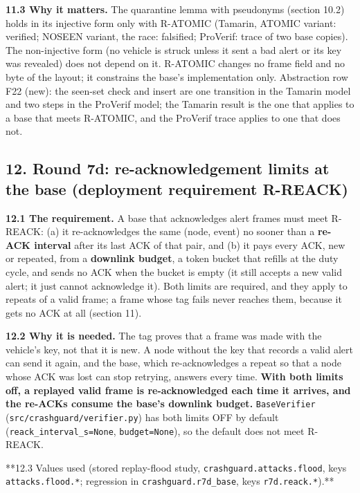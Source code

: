 \textbf{11.3 Why it matters.} The quarantine lemma with pseudonyms (section 10.2) holds in its injective form only with R-ATOMIC (Tamarin, ATOMIC variant: verified; NOSEEN variant, the race: falsified; ProVerif: trace of two base copies). The non-injective form (no vehicle is struck unless it sent a bad alert or its key was revealed) does not depend on it. R-ATOMIC changes no frame field and no byte of the layout; it constrains the base's implementation only. Abstraction row F22 (new): the seen-set check and insert are one transition in the Tamarin model and two steps in the ProVerif model; the Tamarin result is the one that applies to a base that meets R-ATOMIC, and the ProVerif trace applies to one that does not.



\subsection*{12. Round 7d: re-acknowledgement limits at the base (deployment requirement R-REACK)}

\textbf{12.1 The requirement.} A base that acknowledges alert frames must meet R-REACK: (a) it re-acknowledges the same (node, event) no sooner than a \textbf{re-ACK interval} after its last ACK of that pair, and (b) it pays every ACK, new or repeated, from a \textbf{downlink budget}, a token bucket that refills at the duty cycle, and sends no ACK when the bucket is empty (it still accepts a new valid alert; it just cannot acknowledge it). Both limits are required, and they apply to repeats of a valid frame; a frame whose tag fails never reaches them, because it gets no ACK at all (section 11).

\textbf{12.2 Why it is needed.} The tag proves that a frame was made with the vehicle's key, not that it is new. A node without the key that records a valid alert can send it again, and the base, which re-acknowledges a repeat so that a node whose ACK was lost can stop retrying, answers every time. \textbf{With both limits off, a replayed valid frame is re-acknowledged each time it arrives, and the re-ACKs consume the base's downlink budget.} \texttt{BaseVerifier} (\texttt{src/crashguard/verifier.py}) has both limits OFF by default (\texttt{reack\_interval\_s=None}, \texttt{budget=None}), so the default does not meet R-REACK.

**12.3 Values used (stored replay-flood study, \texttt{crashguard.attacks.flood}, keys \texttt{attacks.flood.*}; regression in \texttt{crashguard.r7d\_base}, keys \texttt{r7d.reack.*}).**


